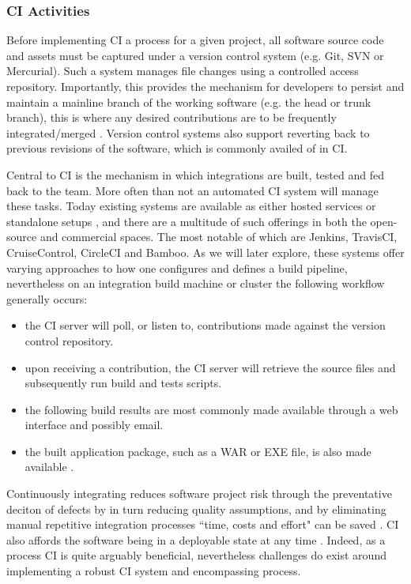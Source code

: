 \documentclass{report}
\begin{document}
\subsubsection{CI Activities}
Before implementing CI a process for a given project, all software source code
and assets must be captured under a version control system (e.g. Git, SVN or Mercurial).
Such a system manages file changes using a controlled access repository. Importantly,
this provides the mechanism for developers to persist and maintain a mainline branch of the working software 
(e.g. the head or trunk branch), this is where any desired contributions are to be frequently 
integrated/merged \citep{Vas}. Version control systems also support reverting back to
previous revisions of the software, which is commonly availed of in CI. 
\par
Central to CI is the mechanism in which integrations are built, tested and fed back to the team. 
More often than not an automated CI system will manage these tasks. Today existing systems
are available as either hosted services or standalone setups \citep{Gous}, and there are
a multitude of such offerings in both the open-source and commercial spaces. 
The most notable of which are Jenkins, TravisCI, CruiseControl, CircleCI and Bamboo. 
As we will later explore, these systems offer varying approaches to how one configures and
defines a build pipeline, nevertheless on an integration build machine or cluster the following workflow generally occurs:
\begin{itemize}  
\item the CI server will poll, or listen to, contributions 
made against the version control repository.
\item upon receiving a contribution, the CI 
server will retrieve the source files and subsequently run build and tests scripts. 
\item the following build results are most commonly made available through a web interface and possibly
email.
\item the built application package, such as a WAR or EXE file, is also made available \citep{Stahl}.
\end{itemize}
\par
Continuously integrating reduces software project risk through 
the preventative deciton of defects by in turn reducing quality 
assumptions, and by eliminating manual repetitive integration
processes ``time, costs and effort" can be saved  \citep{Vas}.
CI also affords the software being in a deployable state at any time \citep{Jez}.
Indeed, as a process CI is quite arguably beneficial, nevertheless challenges 
do exist around implementing a robust CI system 
and encompassing process.
\end{document}
